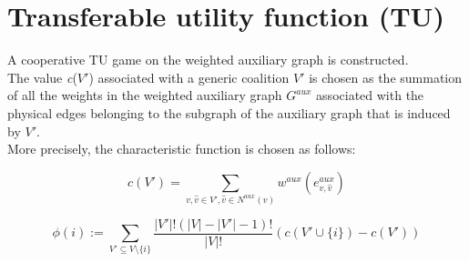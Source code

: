 \section{Transferable utility function (TU)}
A cooperative TU game on the weighted auxiliary graph is constructed. \\
The value \textit{c}($V'$) associated with a generic coalition $V'$ is chosen as the summation of all the weights in the weighted auxiliary graph $G^{aux}$ associated with
the physical edges belonging to the subgraph of the auxiliary graph that is induced by $V'$.\\
More precisely, the characteristic function is chosen as follows:


\begin{center}
    \begin{equation}
    c(V') = \sum_{v, \hat{v} \in V', \hat{v} \in N^{aux}(v)} w^{aux}(e^{aux}_{v, \hat{v}})
    \end{equation}
\end{center}
    
\begin{center}
    \begin{equation}
    \phi(i) := \sum_{V'\subseteq V\setminus \{i\}} \frac{|V'|! (|V|-|V'|-1)!}{|V|!} (c(V' \cup \{i\}) - c(V'))
    \end{equation}
\end{center}
    